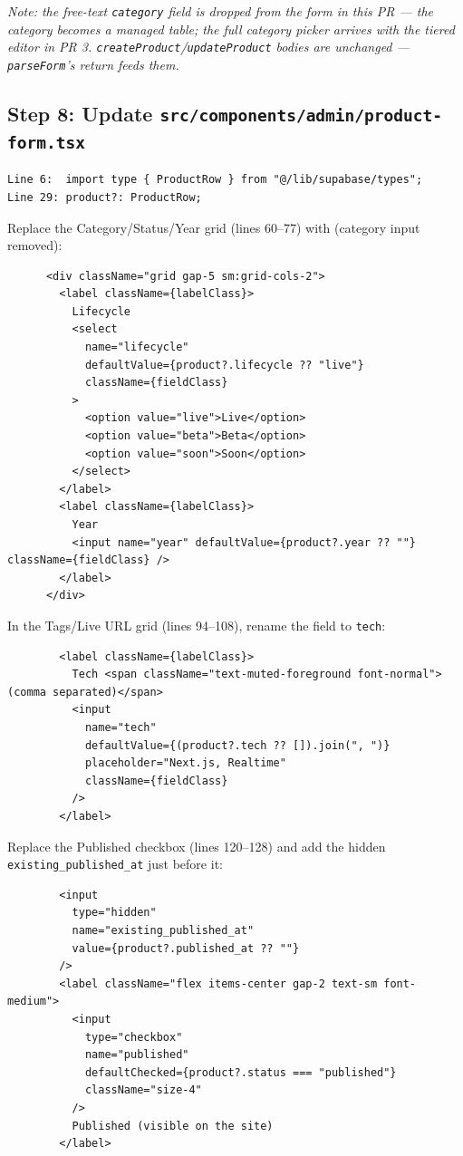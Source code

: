 \documentclass[11pt,a4paper]{article}
\begin{document}
\emph{Note: the free-text \texttt{category} field is dropped from the form in this PR --- the
category becomes a managed table; the full category picker arrives with the tiered editor in
PR 3. \texttt{createProduct}/\texttt{updateProduct} bodies are unchanged --- \texttt{parseForm}'s
return feeds them.}

\subsection*{Step 8: Update \texttt{src/components/admin/product-form.tsx}}

\begin{lstlisting}
Line 6:  import type { ProductRow } from "@/lib/supabase/types";
Line 29: product?: ProductRow;
\end{lstlisting}

Replace the Category/Status/Year grid (lines 60--77) with (category input removed):

\begin{lstlisting}
      <div className="grid gap-5 sm:grid-cols-2">
        <label className={labelClass}>
          Lifecycle
          <select
            name="lifecycle"
            defaultValue={product?.lifecycle ?? "live"}
            className={fieldClass}
          >
            <option value="live">Live</option>
            <option value="beta">Beta</option>
            <option value="soon">Soon</option>
          </select>
        </label>
        <label className={labelClass}>
          Year
          <input name="year" defaultValue={product?.year ?? ""} className={fieldClass} />
        </label>
      </div>
\end{lstlisting}

In the Tags/Live URL grid (lines 94--108), rename the field to \texttt{tech}:

\begin{lstlisting}
        <label className={labelClass}>
          Tech <span className="text-muted-foreground font-normal">(comma separated)</span>
          <input
            name="tech"
            defaultValue={(product?.tech ?? []).join(", ")}
            placeholder="Next.js, Realtime"
            className={fieldClass}
          />
        </label>
\end{lstlisting}

Replace the Published checkbox (lines 120--128) and add the hidden
\texttt{existing\_published\_at} just before it:

\begin{lstlisting}
        <input
          type="hidden"
          name="existing_published_at"
          value={product?.published_at ?? ""}
        />
        <label className="flex items-center gap-2 text-sm font-medium">
          <input
            type="checkbox"
            name="published"
            defaultChecked={product?.status === "published"}
            className="size-4"
          />
          Published (visible on the site)
        </label>
\end{lstlisting}
\end{document}

